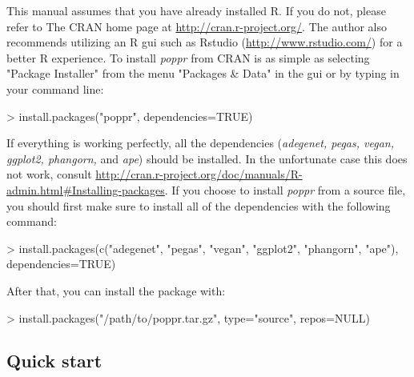 \documentclass[letterpaper]{article}
\newcommand{\tab}{\hspace*{1em}}
\begin{document}
\tab\tab This manual assumes that you have already installed R. If you do not, please refer to The CRAN home page at \url{http://cran.r-project.org/}. The author also recommends utilizing an R gui such as Rstudio (\url{http://www.rstudio.com/}) for a better R experience. 
To install \textit{poppr} from CRAN is as simple as selecting "Package Installer" from the menu "Packages \& Data" in the gui or by typing in your command line:
\begin{Schunk}
\begin{Sinput}
> install.packages("poppr", dependencies=TRUE)
\end{Sinput}
\end{Schunk}
If everything is working perfectly, all the dependencies (\textit{adegenet, pegas, vegan, ggplot2, phangorn,} and \textit{ape}) should be installed. In the unfortunate case this does not work, consult \url{http://cran.r-project.org/doc/manuals/R-admin.html#Installing-packages}.
If you choose to install \textit{poppr} from a source file, you should first make sure to install all of the dependencies with the following command:
\begin{Schunk}
\begin{Sinput}
> install.packages(c("adegenet", "pegas", "vegan", "ggplot2", "phangorn", "ape"), dependencies=TRUE)
\end{Sinput}
\end{Schunk}
After that, you can install the package with:
\begin{Schunk}
\begin{Sinput}
> install.packages("/path/to/poppr.tar.gz", type="source", repos=NULL)
\end{Sinput}
\end{Schunk}
\subsection{Quick start}
\end{document}
